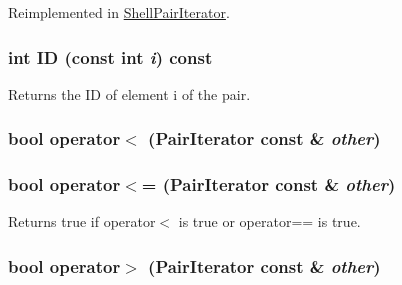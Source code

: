 Reimplemented in \hyperlink{classJKBuilder_1_1ShellPairIterator_a7874a07e98b52f4f147cde6f39353bae}{ShellPairIterator}.\hypertarget{classJKBuilder_1_1PairIterator_a370ad37c854fbbf6421ebf9ab35cd027}{
\subsubsection[{ID}]{\setlength{\rightskip}{0pt plus 5cm}int ID (const int {\em i}) const}}
\label{classJKBuilder_1_1PairIterator_a370ad37c854fbbf6421ebf9ab35cd027}


Returns the ID of element i of the pair. \hypertarget{classJKBuilder_1_1PairIterator_a1984297ca1081efc0513ec2f5e6a6177}{
\subsubsection[{operator$<$}]{\setlength{\rightskip}{0pt plus 5cm}bool operator$<$ ({\bf PairIterator} const \& {\em other})}}
\label{classJKBuilder_1_1PairIterator_a1984297ca1081efc0513ec2f5e6a6177}
\hypertarget{classJKBuilder_1_1PairIterator_a9c95b8dd7929cb34336a944ce96e88a7}{
\subsubsection[{operator$<$=}]{\setlength{\rightskip}{0pt plus 5cm}bool operator$<$= ({\bf PairIterator} const \& {\em other})}}
\label{classJKBuilder_1_1PairIterator_a9c95b8dd7929cb34336a944ce96e88a7}


Returns true if operator$<$ is true or operator== is true. \hypertarget{classJKBuilder_1_1PairIterator_ab37a738406950a5e19931f4c09b41f29}{
\subsubsection[{operator$>$}]{\setlength{\rightskip}{0pt plus 5cm}bool operator$>$ ({\bf PairIterator} const \& {\em other})}}
\label{classJKBuilder_1_1PairIterator_ab37a738406950a5e19931f4c09b41f29}


